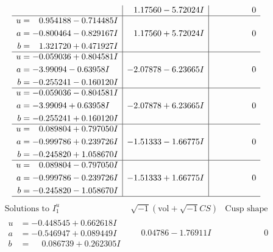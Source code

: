 \documentclass[1p]{elsarticle_modified}
\theoremstyle{definition}
\newcommand{\I}{\sqrt{-1}}
\begin{document}
$$\begin{array}{c|c|c}
 & \phantom{-}1.17560 - 5.72024 I & \phantom{-0.000000 } 0 \\ \hline\begin{aligned}
u &= \phantom{-}0.954188 - 0.714485 I \\
a &= -0.800464 - 0.829167 I \\
b &= \phantom{-}1.321720 + 0.471927 I\end{aligned}
 & \phantom{-}1.17560 + 5.72024 I & \phantom{-0.000000 } 0 \\ \hline\begin{aligned}
u &= -0.059036 + 0.804581 I \\
a &= -3.99094 - 0.63958 I \\
b &= -0.255241 - 0.160120 I\end{aligned}
 & -2.07878 - 6.23665 I & \phantom{-0.000000 } 0 \\ \hline\begin{aligned}
u &= -0.059036 - 0.804581 I \\
a &= -3.99094 + 0.63958 I \\
b &= -0.255241 + 0.160120 I\end{aligned}
 & -2.07878 + 6.23665 I & \phantom{-0.000000 } 0 \\ \hline\begin{aligned}
u &= \phantom{-}0.089804 + 0.797050 I \\
a &= -0.999786 + 0.239726 I \\
b &= -0.245820 + 1.058670 I\end{aligned}
 & -1.51333 - 1.66775 I & \phantom{-0.000000 } 0 \\ \hline\begin{aligned}
u &= \phantom{-}0.089804 - 0.797050 I \\
a &= -0.999786 - 0.239726 I \\
b &= -0.245820 - 1.058670 I\end{aligned}
 & -1.51333 + 1.66775 I & \phantom{-0.000000 } 0\\
 \hline 
 \end{array}$$\newpage$$\begin{array}{c|c|c}  
\text{Solutions to }I^u_{1}& \I (\text{vol} + \sqrt{-1}CS) & \text{Cusp shape}\\
 \hline 
\begin{aligned}
u &= -0.448545 + 0.662618 I \\
a &= -0.546947 + 0.089449 I \\
b &= \phantom{-}0.086739 + 0.262305 I\end{aligned}
 & \phantom{-}0.04786 - 1.76911 I & \phantom{-0.000000 } 0 \\ \hline\begin{aligned}

\end{aligned}
\end{array}$$
\end{document}
